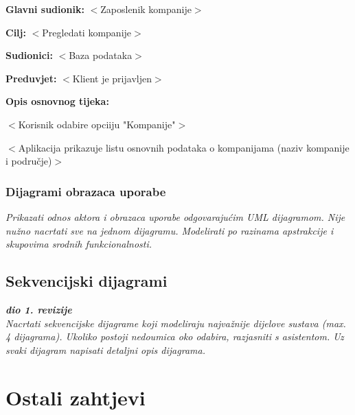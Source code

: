 					\noindent {}
					\begin{packed_item}

						\item \textbf{Glavni sudionik: }$<$Zaposlenik kompanije$>$
						\item  \textbf{Cilj:} $<$Pregledati kompanije$>$
						\item  \textbf{Sudionici:} $<$Baza podataka$>$
						\item  \textbf{Preduvjet:} $<$Klient je prijavljen$>$
						\item  \textbf{Opis osnovnog tijeka:}

						\item[] \begin{packed_enum}

							\item $<$Korisnik odabire opciiju "Kompanije"$>$
							\item $<$Aplikacija prikazuje listu osnovnih podataka o kompanijama
							(naziv kompanije i područje)$>$
						\end{packed_enum}
					\end{packed_item}
					
				\subsubsection{Dijagrami obrazaca uporabe}
					
					\textit{Prikazati odnos aktora i obrazaca uporabe odgovarajućim UML dijagramom. Nije nužno nacrtati sve na jednom dijagramu. Modelirati po razinama apstrakcije i skupovima srodnih funkcionalnosti.}
				\eject		
				
			\subsection{Sekvencijski dijagrami}
				
				\textbf{\textit{dio 1. revizije}}\\
				
				\textit{Nacrtati sekvencijske dijagrame koji modeliraju najvažnije dijelove sustava (max. 4 dijagrama). Ukoliko postoji nedoumica oko odabira, razjasniti s asistentom. Uz svaki dijagram napisati detaljni opis dijagrama.}
				\eject
	
		\section{Ostali zahtjevi}
		
